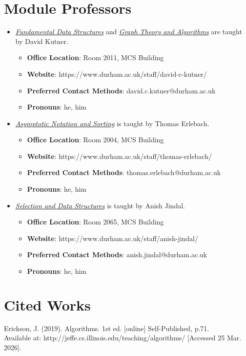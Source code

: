 \documentclass{article}
\begin{document}
\section{Module Professors}

\begin{itemize}
    \item \hyperref[part:1.fds]{\textit{Fundamental Data Structures}} and \hyperref[part:4.gta]{\textit{Graph Theory and Algorithms}} are taught by David Kutner.
    \begin{itemize}
        \item \textbf{Office Location}: Room 2011, MCS Building
        \item \textbf{Website}: https://www.durham.ac.uk/staff/david-c-kutner/
        \item \textbf{Preferred Contact Methods}: david.c.kutner@durham.ac.uk
        \item \textbf{Pronouns}: he, him
    \end{itemize}
    
    \item \hyperref[part:2.ans]{\textit{Asymptotic Notation and Sorting}} is taught by Thomas Erlebach.
    \begin{itemize}
        \item \textbf{Office Location}: Room 2004, MCS Building
        \item \textbf{Website}: https://www.durham.ac.uk/staff/thomas-erlebach/
        \item \textbf{Preferred Contact Methods}: thomas.erlebach@durham.ac.uk
        \item \textbf{Pronouns}: he, him
    \end{itemize}
    
    \item \hyperref[part:3.sds]{\textit{Selection and Data Structures}} is taught by Anish Jindal.
    \begin{itemize}
        \item \textbf{Office Location}: Room 2065, MCS Building
        \item \textbf{Website}: https://www.durham.ac.uk/staff/anish-jindal/
        \item \textbf{Preferred Contact Methods}: anish.jindal@durham.ac.uk
        \item \textbf{Pronouns}: he, him
    \end{itemize}
\end{itemize}

\section{Cited Works}

Erickson, J. (2019). Algorithms. 1st ed. [online] Self-Published, p.71. \\ Available at: http://jeffe.cs.illinois.edu/teaching/algorithms/ [Accessed 25 Mar. 2026].\label{cit:1.algorithms}
\end{document}
